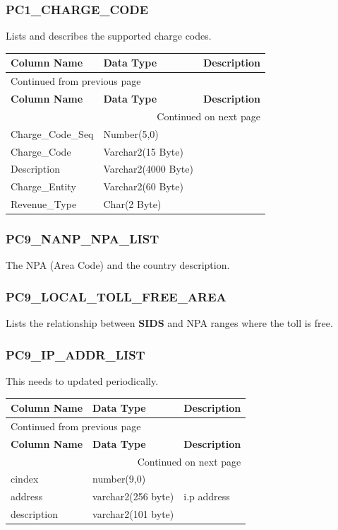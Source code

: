 \documentclass[12pt,twoside]{article}
\begin{document}
\subsubsection{PC1\_CHARGE\_CODE}
\label{sec:orgheadline127}
Lists and describes the supported charge codes.
\footnotesize

\begin{longtable}{l|l|l}
\hline
\textbf{Column Name} & \textbf{Data Type} & \textbf{Description}\\
\hline
\endfirsthead
\multicolumn{3}{l}{Continued from previous page} \\
\hline

\textbf{Column Name} & \textbf{Data Type} & \textbf{Description} \\

\hline
\endhead
\hline\multicolumn{3}{r}{Continued on next page} \\
\endfoot
\endlastfoot
\hline
Charge\_Code\_Seq & Number(5,0) & \\
Charge\_Code & Varchar2(15 Byte) & \\
Description & Varchar2(4000 Byte) & \\
Charge\_Entity & Varchar2(60 Byte) & \\
Revenue\_Type & Char(2 Byte) & \\
\hline
\end{longtable}

\normalsize
\subsubsection{PC9\_NANP\_NPA\_LIST}
\label{sec:orgheadline128}
The NPA (Area Code) and the country description.
\subsubsection{PC9\_LOCAL\_TOLL\_FREE\_AREA}
\label{sec:orgheadline129}
Lists the relationship between \textbf{SIDS} and NPA ranges where
the toll is free.
\subsubsection{PC9\_IP\_ADDR\_LIST}
\label{sec:orgheadline130}
This needs to updated periodically.
\footnotesize

\begin{longtable}{l|l|l}
\hline
\textbf{Column Name} & \textbf{Data Type} & \textbf{Description}\\
\hline
\endfirsthead
\multicolumn{3}{l}{Continued from previous page} \\
\hline

\textbf{Column Name} & \textbf{Data Type} & \textbf{Description} \\

\hline
\endhead
\hline\multicolumn{3}{r}{Continued on next page} \\
\endfoot
\endlastfoot
\hline
cindex & number(9,0) & \\
address & varchar2(256 byte) & i.p address\\
description & varchar2(101 byte) & \\
\hline
\end{longtable}
\normalsize
\end{document}
